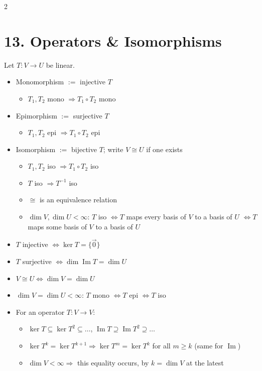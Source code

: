 \documentclass[fleqn]{article}
\begin{document}
\begin{multicols}{2}
\section*{13. Operators \& Isomorphisms}
Let $T:V \to U$ be linear.
\begin{itemize}
\item Monomorphism $:=$ injective $T$
\begin{itemize}
\item $T_1,T_2$ mono $\Rightarrow T_1 \circ T_2$ mono
\end{itemize}
\item Epimorphism $:=$ surjective $T$
\begin{itemize}
\item $T_1,T_2$ epi $\Rightarrow T_1 \circ T_2$ epi
\end{itemize}
\item Isomorphism $:=$ bijective $T$; write $V \cong U$ if one exists
\begin{itemize}
\item $T_1,T_2$ iso $\Rightarrow T_1 \circ T_2$ iso
\item $T$ iso $\Rightarrow T^{-1}$ iso
\item $\cong$ is an equivalence relation
\item $\dim V,\dim U<\infty$: $T$ iso $\iff T$ maps every basis of $V$ to a basis of $U$ $\iff T$ maps some basis of $V$ to a basis of $U$
\end{itemize}
\item $T$ injective $\iff \ker T = \{\vec{0}\}$
\item $T$ surjective $\iff \dim \operatorname{Im}T = \dim U$
\item $V \cong U \iff \dim V = \dim U$
\item $\dim V = \dim U < \infty$: $T$ mono $\iff T$ epi $\iff T$ iso
\item \color{red} For an operator $T:V \to V$:
\begin{itemize}
\item $\ker T \subseteq \ker T^2 \subseteq \dots$, \quad $\operatorname{Im}T \supseteq \operatorname{Im}T^2 \supseteq \dots$
\item $\ker T^k = \ker T^{k+1} \Rightarrow \ker T^m = \ker T^k$ for all $m \ge k$ (same for $\operatorname{Im}$)
\item $\dim V < \infty \Rightarrow$ this equality occurs, by $k=\dim V$ at the latest
\end{itemize}
\end{itemize}


\end{multicols}
\end{document}

